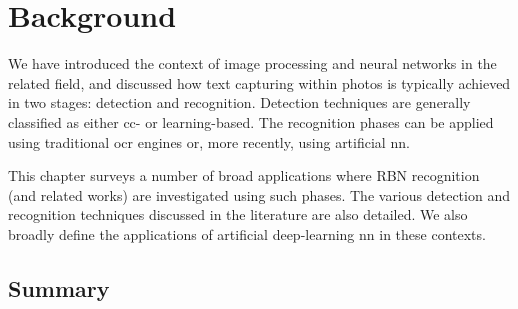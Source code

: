\chapter{Background}
\label{ch:background}


We have introduced the context of image processing and neural networks in the related field, and discussed how text capturing within photos is typically achieved in two stages: detection and recognition. Detection techniques are generally classified as either \gls{cc}- or learning-based. The recognition phases can be applied using traditional \gls{ocr} engines or, more recently, using artificial \gls{nn}. 

This chapter surveys a number of broad applications where RBN recognition (and related works) are investigated using such phases. The various detection and recognition techniques discussed in the literature are also detailed. We also broadly define the applications of artificial deep-learning \gls{nn} in these contexts.



\section*{Summary}

